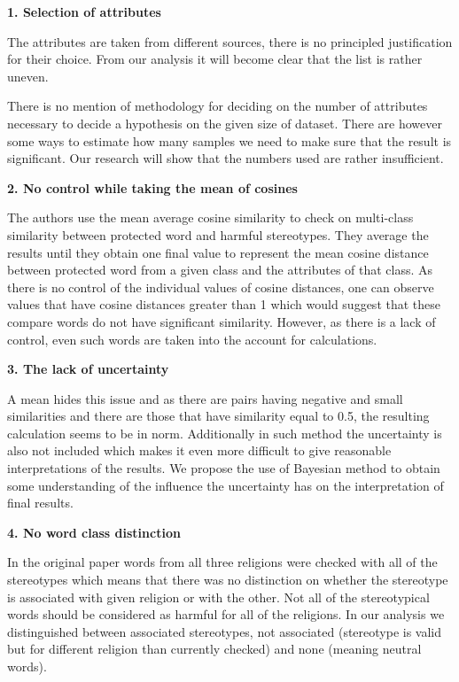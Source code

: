 \documentclass[12pt,]{book}
\begin{document}
\textbf{1. Selection of attributes}

The attributes are taken from different sources, there is no principled
justification for their choice. From our analysis it will become clear
that the list is rather uneven.

There is no mention of methodology for deciding on the number of
attributes necessary to decide a hypothesis on the given size of
dataset. There are however some ways to estimate how many samples we
need to make sure that the result is significant. Our research will show
that the numbers used are rather insufficient.

\textbf{2. No control while taking the mean of cosines}

The authors use the mean average cosine similarity to check on
multi-class similarity between protected word and harmful stereotypes.
They average the results until they obtain one final value to represent
the mean cosine distance between protected word from a given class and
the attributes of that class. As there is no control of the individual
values of cosine distances, one can observe values that have cosine
distances greater than 1 which would suggest that these compare words do
not have significant similarity. However, as there is a lack of control,
even such words are taken into the account for calculations.

\textbf{3. The lack of uncertainty}

A mean hides this issue and as there are pairs having negative and small
similarities and there are those that have similarity equal to 0.5, the
resulting calculation seems to be in norm. Additionally in such method
the uncertainty is also not included which makes it even more difficult
to give reasonable interpretations of the results. We propose the use of
Bayesian method to obtain some understanding of the influence the
uncertainty has on the interpretation of final results.

\textbf{4. No word class distinction}

In the original paper words from all three religions were checked with
all of the stereotypes which means that there was no distinction on
whether the stereotype is associated with given religion or with the
other. Not all of the stereotypical words should be considered as
harmful for all of the religions. In our analysis we distinguished
between associated stereotypes, not associated (stereotype is valid but
for different religion than currently checked) and none (meaning neutral
words).
\end{document}
